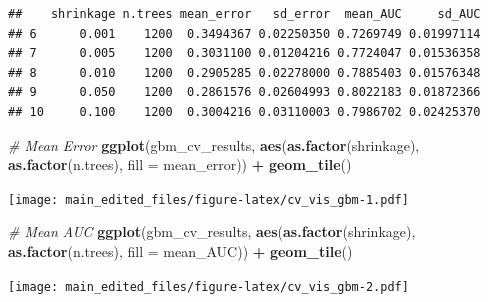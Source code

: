 \documentclass[
]{article}
\newenvironment{Shaded}{\begin{snugshade}}{\end{snugshade}}
\newcommand{\CommentTok}[1]{\textcolor[rgb]{0.56,0.35,0.01}{\textit{#1}}}
\newcommand{\DataTypeTok}[1]{\textcolor[rgb]{0.13,0.29,0.53}{#1}}
\newcommand{\DecValTok}[1]{\textcolor[rgb]{0.00,0.00,0.81}{#1}}
\newcommand{\KeywordTok}[1]{\textcolor[rgb]{0.13,0.29,0.53}{\textbf{#1}}}
\newcommand{\NormalTok}[1]{#1}
\newcommand{\OperatorTok}[1]{\textcolor[rgb]{0.81,0.36,0.00}{\textbf{#1}}}
\newcommand{\StringTok}[1]{\textcolor[rgb]{0.31,0.60,0.02}{#1}}
\begin{document}
\begin{verbatim}
##    shrinkage n.trees mean_error   sd_error  mean_AUC     sd_AUC
## 6      0.001    1200  0.3494367 0.02250350 0.7269749 0.01997114
## 7      0.005    1200  0.3031100 0.01204216 0.7724047 0.01536358
## 8      0.010    1200  0.2905285 0.02278000 0.7885403 0.01576348
## 9      0.050    1200  0.2861576 0.02604993 0.8022183 0.01872366
## 10     0.100    1200  0.3004216 0.03110003 0.7986702 0.02425370
\end{verbatim}

\begin{Shaded}
\begin{Highlighting}[]
\CommentTok{# Mean Error}
\KeywordTok{ggplot}\NormalTok{(gbm_cv_results, }\KeywordTok{aes}\NormalTok{(}\KeywordTok{as.factor}\NormalTok{(shrinkage), }\KeywordTok{as.factor}\NormalTok{(n.trees), }\DataTypeTok{fill =}\NormalTok{ mean_error)) }\OperatorTok{+}\StringTok{ }
\StringTok{  }\KeywordTok{geom_tile}\NormalTok{()}
\end{Highlighting}
\end{Shaded}

\texttt{[image: main\_edited\_files/figure-latex/cv\_vis\_gbm-1.pdf]}

\begin{Shaded}
\begin{Highlighting}[]
\CommentTok{# Mean AUC}
\KeywordTok{ggplot}\NormalTok{(gbm_cv_results, }\KeywordTok{aes}\NormalTok{(}\KeywordTok{as.factor}\NormalTok{(shrinkage), }\KeywordTok{as.factor}\NormalTok{(n.trees), }\DataTypeTok{fill =}\NormalTok{ mean_AUC)) }\OperatorTok{+}\StringTok{ }
\StringTok{  }\KeywordTok{geom_tile}\NormalTok{()}
\end{Highlighting}
\end{Shaded}

\texttt{[image: main\_edited\_files/figure-latex/cv\_vis\_gbm-2.pdf]}

\begin{Shaded}
\end{Shaded}
\end{document}
